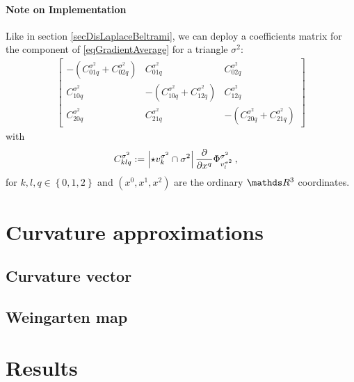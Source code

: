       \paragraph{Note on Implementation}
        Like in section \ref{secDisLaplaceBeltrami}, we can deploy a coefficients matrix for the  component of 
        \eqref{eqGradientAverage} for a triangle \( \sigma^{2} \):
        \begin{align}
            \begin{bmatrix}
              -\left( C^{\sigma^{2}}_{01q} + C^{\sigma^{2}}_{02q}\right) & C^{\sigma^{2}}_{01q} & C^{\sigma^{2}}_{02q} \\
              C^{\sigma^{2}}_{10q} & -\left( C^{\sigma^{2}}_{10q} + C^{\sigma^{2}}_{12q}\right) & C^{\sigma^{2}}_{12q} \\
              C^{\sigma^{2}}_{20q} & C^{\sigma^{2}}_{21q} & -\left( C^{\sigma^{2}}_{20q} + C^{\sigma^{2}}_{21q}\right)
            \end{bmatrix}
        \end{align}
        with 
        \begin{align}
          C^{\sigma^{2}}_{klq} &:= \left| \star v_{k}^{\sigma^{2}} \cap \sigma^{2} \right|
                                   \frac{\partial}{\partial x^{q}} \Phi^{\sigma^{2}}_{v_{l}^{\sigma^{2}}} \,\text{,}
        \end{align}
        for \( k,l,q\in\left\{ 0,1,2 \right\} \) 
        and \( \left( x^{0}, x^{1}, x^{2} \right) \) are the ordinary \( \R^{3} \) coordinates.

        



      
\section{Curvature approximations}
  \subsection{Curvature vector} \label{secCurvatureVector}
  \subsection{Weingarten map} \label{secWeingarten}

\section{Results} \label{secResults}
  
